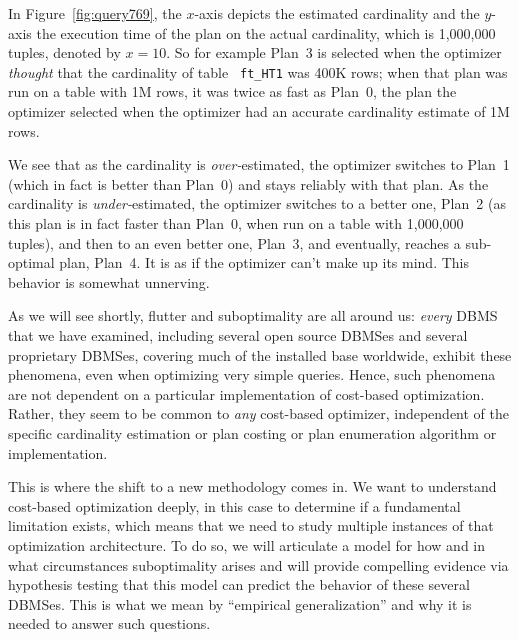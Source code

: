 \begin{figure*}[tb]
\centering
\caption{Suboptimality and Fluttering in Query 769\label{fig:query769}}
\end{figure*}

In Figure~\ref{fig:query769},
 the \hbox{$x$-axis} depicts the
estimated cardinality and the $y$-axis the execution time of the plan on the
actual cardinality, which is 1,000,000 tuples, denoted by $x=10$. So for example Plan~3 is
selected when the optimizer {\em thought} that the cardinality of table {\tt
  ft\_HT1} was 400K rows; when that plan was run on a table with 1M rows, it
was twice as fast as Plan~0, the plan the optimizer selected when the
optimizer had an accurate cardinality estimate of 1M rows.

We see that as the cardinality is {\em
  over-}estimated, the optimizer switches to Plan~1 (which in fact is better than Plan~0) 
and stays reliably with that plan. As the cardinality 
is {\em under-}estimated, the optimizer switches to a better one, 
Plan~2 (as this plan is in fact faster than Plan~0, when run on a table with
1,000,000 tuples), and then to an even better one, Plan~3, and eventually,
reaches a sub-optimal plan, Plan~4. 
It is as if the optimizer can't make up its mind. This
behavior is somewhat unnerving.

As we will see shortly, flutter and suboptimality are all around us: {\em
  every} \hbox{DBMS} that we have examined, including several open source
\hbox{DBMSes} and several proprietary  \hbox{DBMSes},
covering much of the installed base worldwide, exhibit these phenomena, even
when optimizing very simple queries. Hence, such phenomena are not dependent
on a particular implementation of cost-based optimization. Rather, they seem
to be common to {\em any} cost-based optimizer, independent of the specific
cardinality estimation or plan costing or plan enumeration algorithm or
implementation.

This is where the shift to a new methodology comes in. We want to understand
cost-based optimization deeply, in this case to determine if a fundamental
limitation exists, which means that we need to study multiple instances of
that optimization architecture. To do so, we will articulate a model for how
and in what circumstances suboptimality arises and will provide compelling
evidence via hypothesis testing that this model can predict the behavior of
these several \hbox{DBMSes}. This is what we mean by ``empirical
generalization'' and why it is needed to answer such questions.
